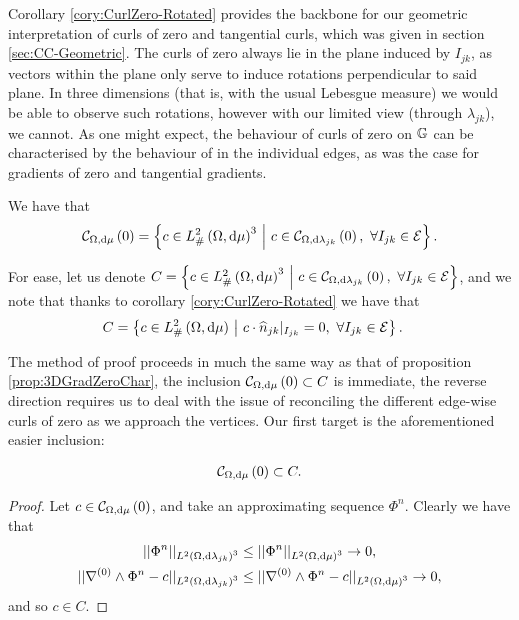 Corollary \ref{cory:CurlZero-Rotated} provides the backbone for our geometric interpretation of curls of zero and tangential curls, which was given in section \ref{sec:CC-Geometric}.
The curls of zero always lie in the plane induced by $I_{jk}$, as vectors within the plane only serve to induce rotations perpendicular to said plane.
In three dimensions (that is, with the usual Lebesgue measure) we would be able to observe such rotations, however with our limited view (through $\lambda_{jk}$), we cannot.
As one might expect, the behaviour of curls of zero on $\mathbb{G}$ can be characterised by the behaviour of in the individual edges, as was the case for gradients of zero and tangential gradients.
\begin{theorem} \label{thm:CurlZeroChar}
	We have that
	\begin{align*}
		\mathcal{C}_{ \Omega, \mathrm{d}\mu}\left( 0 \right) = \left\{  c\in L^2_{\#}\left( \Omega,\mathrm{d} \mu \right)^3 \ \middle\vert \  c\in\mathcal{C}_{ \Omega, \mathrm{d}\lambda_{jk}}\left( 0 \right), \ \forall I_{jk}\in\mathcal{E}  \right\}.
	\end{align*}
\end{theorem}
For ease, let us denote $C = \left\{  c\in L^2_{\#}\left( \Omega,\mathrm{d} \mu \right)^3 \ \middle\vert \  c\in\mathcal{C}_{ \Omega, \mathrm{d}\lambda_{jk}}\left( 0 \right), \ \forall I_{jk}\in\mathcal{E}  \right\}$, and we note that thanks to corollary \ref{cory:CurlZero-Rotated} we have that
\begin{align*}
	C &= \left\{  c\in L^2_{\#}\left( \Omega,\mathrm{d} \mu \right) \ \middle\vert \  c\cdot\widehat{n}_{jk}\vert_{I_{jk}}=0, \ \forall I_{jk}\in\mathcal{E}  \right\}.
\end{align*}

The method of proof proceeds in much the same way as that of proposition \ref{prop:3DGradZeroChar}, the inclusion $\mathcal{C}_{ \Omega, \mathrm{d}\mu}\left( 0 \right)\subset C$ is immediate, the reverse direction requires us to deal with the issue of reconciling the different edge-wise curls of zero as we approach the vertices.
Our first target is the aforementioned easier inclusion:
\begin{lemma} \label{lem:CurlZeroInC}
	\begin{align*}
		\mathcal{C}_{ \Omega, \mathrm{d}\mu}\left( 0 \right) \subset C.
	\end{align*}
\end{lemma}
\begin{proof}
	Let $c\in\mathcal{C}_{ \Omega, \mathrm{d}\mu}\left( 0 \right)$, and take an approximating sequence $\Phi^n$.
	Clearly we have that
	\begin{align*}
		\lvert\lvert  \Phi^n  \rvert\rvert_{L^{2}\left( \Omega,\mathrm{d} \lambda_{jk} \right)^3} &\leq \lvert\lvert  \Phi^n  \rvert\rvert_{L^{2}\left( \Omega,\mathrm{d} \mu \right)^3} \rightarrow 0, \\
		\lvert\lvert  \nabla^{(0)}\wedge\Phi^n - c  \rvert\rvert_{L^{2}\left( \Omega,\mathrm{d} \lambda_{jk} \right)^3} & \leq \lvert\lvert  \nabla^{(0)}\wedge\Phi^n - c  \rvert\rvert_{L^{2}\left( \Omega,\mathrm{d} \mu \right)^3} \rightarrow 0,
	\end{align*}
	and so $c\in C$.
\end{proof}

